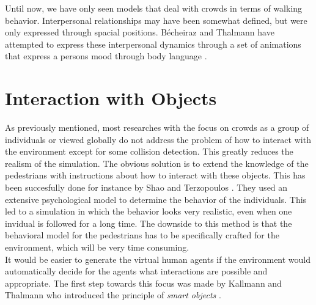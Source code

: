 \documentclass[11pt]{book}
\begin{document}
Until now, we have only seen models that deal with crowds in terms of walking behavior. Interpersonal relationships may have been somewhat defined, but were only expressed through spacial positions. Bécheiraz and Thalmann have attempted to express these interpersonal dynamics through a set of animations that express a persons mood through body language \cite{Becheiraz:1996:MNC:791215.791499}.

\section{Interaction with Objects}
As previously mentioned, most researches with the focus on crowds as a group of individuals or viewed globally do not address the problem of how to interact with the environment except for some collision detection. This greatly reduces the realism of the simulation. The obvious solution is to extend the knowledge of the pedestrians with instructions about how to interact with these objects. This has been succesfully done for instance by Shao and Terzopoulos \cite{A_autonomouspedestrians}. They used an extensive psychological model to determine the behavior of the individuals. This led to a simulation in which the behavior looks very realistic, even when one invidual is followed for a long time. The downside to this method is that the behavioral model for the pedestrians has to be specifically crafted for the environment, which will be very time consuming. \\
It would be easier to generate the virtual human agents if the environment would automatically decide for the agents what interactions are possible and appropriate. The first step towards this focus was made by Kallmann and Thalmann who introduced the principle of \textit{smart objects} \cite{Kallmann98modelingobjects}.
\end{document}
